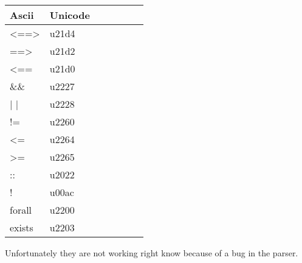 \begin{longtable}[H]
	{l|p{}| p{} | p{} | p{} | p{} | p{}}
	
	\textbf{Ascii} & \textbf{Unicode}  \\ \hline
	<==> & u21d4  \\  
	==> & u21d2  \\  
	<== & u21d0  \\  
	\&\& & u2227  \\  
	| | & u2228  \\  
	!= & u2260  \\  
	<= & u2264  \\  
	>= & u2265  \\  
	:: & u2022  \\  
	! & u00ac  \\  
	forall & u2200  \\  
	exists & u2203  
	
	
\end{longtable}

Unfortunately they are not working right know because of a bug in the parser.






